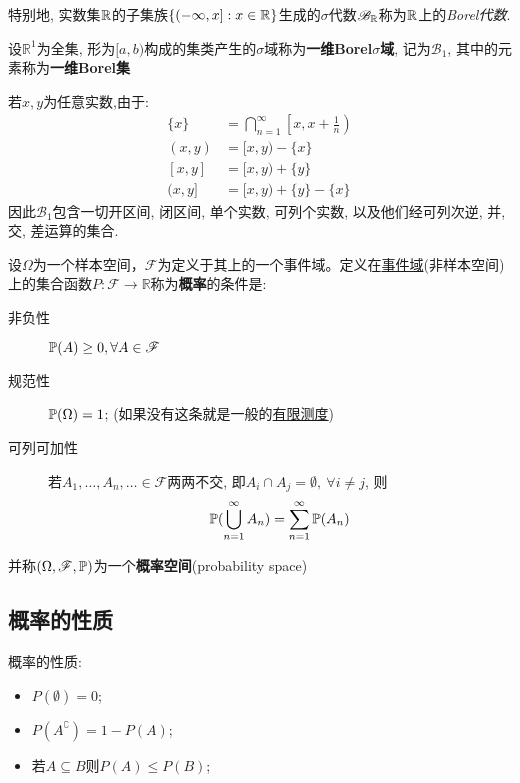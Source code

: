 特别地, 实数集$\R$的子集族$\{(-\infty,x] : x\in\R\}$生成的$\sigma$代数$\mathscr{B}_{\R}$称为$\R$上的\emph{Borel代数}.

\begin{definition}[Borel集]
    设$\mathbb{R}^1$为全集, 形为$[a,b)$构成的集类产生的$\sigma$域称为\textbf{一维Borel$\sigma$域}, 记为$\mathscr{B}_1$, 其中的元素称为\textbf{一维Borel集}
\end{definition}

若$x,y$为任意实数,由于:
\begin{align*}
    \{x\}  & =  \bigcap_{n=1}^{\infty}\left[x, x+\frac1{n}\right) \\
    (x, y) & =  [x, y)-\{x\}                                      \\
    [x, y] & =  [x, y)+\{y\}                                      \\
    (x, y] & =  [x, y)+\{y\}-\{x\}
\end{align*}
因此$\mathscr{B}_1$包含一切开区间, 闭区间, 单个实数, 可列个实数, 以及他们经可列次逆, 并, 交, 差运算的集合.

\begin{definition}[概率空间]
    设$\Omega$为一个样本空间，$\mathscr{F}$为定义于其上的一个事件域。定义在\underline{事件域}(非样本空间)上的集合函数$P : \mathscr{F} \to \mathbb{R}$称为\textbf{概率}的条件是:
    \begin{description}
        \item[非负性]$\P(A)\ge 0 , \forall A \in \mathscr{F}$
        \item[规范性]$\P(\Omega) = 1$; (如果没有这条就是一般的\underline{有限测度})
        \item[可列可加性] 若$A_{1},\dots,A_{n},\ldots \in \mathscr{F}$两两不交, 即$A_{i}\cap A_{j} = \emptyset, \ \forall i\neq j$, 则
            \[ \P(\bigcup_{n=1}^{\infty}A_{n}) = \sum_{n=1}^{\infty}\P(A_{n}) \]
    \end{description}
    并称$(\Omega,\mathscr{F},\P)$为一个\textbf{概率空间}(probability space)
\end{definition}

\subsection{概率的性质}

\begin{property}
    概率的性质:
    \begin{itemize}
        \item$P(\emptyset)=0$;
        \item$P(A^{\complement})=1-P(A)$;
        \item 若$A \subseteq B$则$P(A)\le P(B)$;
    \end{itemize}
\end{property}

